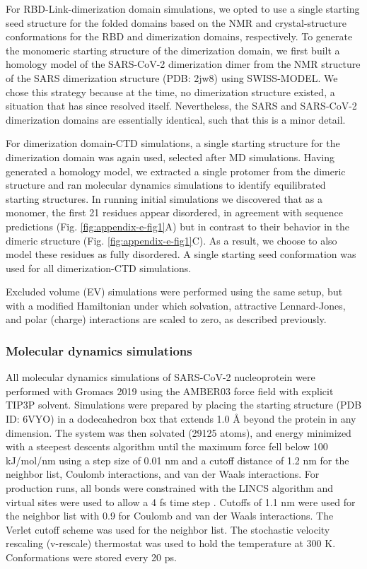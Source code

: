 \documentclass[../main.tex]{subfiles}
\begin{document}
        For RBD-Link-dimerization domain simulations, we opted to use a single starting seed structure for the folded domains based on the NMR and crystal-structure conformations for the RBD and dimerization domains, respectively. To generate the monomeric starting structure of the dimerization domain, we first built a homology model of the SARS-CoV-2 dimerization dimer from the NMR structure of the SARS dimerization structure (PDB: 2jw8) using SWISS-MODEL\cite{waterhouse_swiss-model:_2018,Takeda2008-wl}. We chose this strategy because at the time, no dimerization structure existed, a situation that has since resolved itself\cite{Zinzula2020-mi}. Nevertheless, the SARS and SARS-CoV-2 dimerization domains are essentially identical, such that this is a minor detail.

        For dimerization domain-CTD simulations, a single starting structure for the dimerization domain was again used, selected after MD simulations. Having generated a homology model, we extracted a single protomer from the dimeric structure and ran molecular dynamics simulations to identify equilibrated starting structures. In running initial simulations we discovered that as a monomer, the first 21 residues appear disordered, in agreement with sequence predictions (Fig. \ref{fig:appendix-e-fig1}A) but in contrast to their behavior in the dimeric structure (Fig. \ref{fig:appendix-e-fig1}C). As a result, we choose to also model these residues as fully disordered. A single starting seed conformation was used for all dimerization-CTD simulations.

        Excluded volume (EV) simulations were performed using the same setup, but with a modified Hamiltonian under which solvation, attractive Lennard-Jones, and polar (charge) interactions are scaled to zero, as described previously\cite{Holehouse2015-rg}.

    \subsubsection{Molecular dynamics simulations}
        All molecular dynamics simulations of SARS-CoV-2 nucleoprotein were performed with Gromacs 2019 using the AMBER03 force field with explicit TIP3P solvent\cite{Abraham2015-ea,Duan:2003gt,Jorgensen:1983fl}. Simulations were prepared by placing the starting structure (PDB ID: 6VYO) in a dodecahedron box that extends 1.0 \AA{} beyond the protein in any dimension. The system was then solvated (29125 atoms), and energy minimized with a steepest descents algorithm until the maximum force fell below 100 kJ/mol/nm using a step size of 0.01 nm and a cutoff distance of 1.2 nm for the neighbor list, Coulomb interactions, and van der Waals interactions. For production runs, all bonds were constrained with the LINCS algorithm and virtual sites were used to allow a 4 fs time step \cite{Feenstra:1999ue,Hess:2008fl}. Cutoffs of 1.1 nm were used for the neighbor list with 0.9 for Coulomb and van der Waals interactions. The Verlet cutoff scheme was used for the neighbor list. The stochastic velocity rescaling (v-rescale) thermostat was used to hold the temperature at 300 K\cite{Bussi:2007cs}. Conformations were stored every 20 ps.
\end{document}
